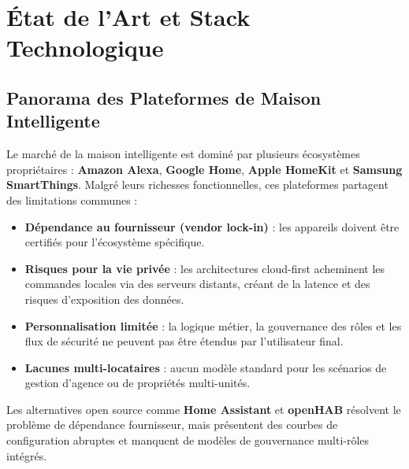 \chapter{État de l'Art et Stack Technologique}

\section{Panorama des Plateformes de Maison Intelligente}

Le marché de la maison intelligente est dominé par plusieurs écosystèmes propriétaires :
\textbf{Amazon Alexa}, \textbf{Google Home}, \textbf{Apple HomeKit} et
\textbf{Samsung SmartThings}. Malgré leurs richesses fonctionnelles, ces plateformes
partagent des limitations communes :

\begin{itemize}[leftmargin=1.5cm,itemsep=6pt]
  \item \textbf{Dépendance au fournisseur (vendor lock-in)} : les appareils doivent être
        certifiés pour l'écosystème spécifique.
  \item \textbf{Risques pour la vie privée} : les architectures cloud-first acheminent les
        commandes locales via des serveurs distants, créant de la latence et des risques
        d'exposition des données.
  \item \textbf{Personnalisation limitée} : la logique métier, la gouvernance des rôles et
        les flux de sécurité ne peuvent pas être étendus par l'utilisateur final.
  \item \textbf{Lacunes multi-locataires} : aucun modèle standard pour les scénarios de
        gestion d'agence ou de propriétés multi-unités.
\end{itemize}

Les alternatives open source comme \textbf{Home Assistant} et \textbf{openHAB} résolvent
le problème de dépendance fournisseur, mais présentent des courbes de configuration
abruptes et manquent de modèles de gouvernance multi-rôles intégrés.

